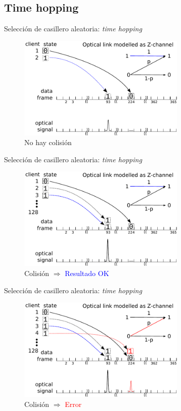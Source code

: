 \documentclass[aspectratio=169]{beamer}
\begin{document}
\subsection{Time hopping}
\begin{frame}{Selección de casillero aleatoria: \textit{time hopping}}
\begin{figure}[t]
  \centering
    \includegraphics[width=8cm]{graphs/slide2.pdf}
    \\ \huge No hay colisión
\end{figure}
\end{frame}
\begin{frame}{Selección de casillero aleatoria: \textit{time hopping}}
\begin{figure}[t]
  \centering
    \includegraphics[width=8cm]{graphs/slide3.pdf}
    \\ \huge Colisión $\Rightarrow$ \textcolor{blue}{Resultado OK}
\end{figure}
\end{frame}
\begin{frame}{Selección de casillero aleatoria: \textit{time hopping}}
\begin{figure}[t]
  \centering
    \includegraphics[width=8cm]{graphs/slide4.pdf}
    \\ \huge Colisión $\Rightarrow$ \textcolor{red}{Error}
\end{figure}
\end{frame}
\end{document}
